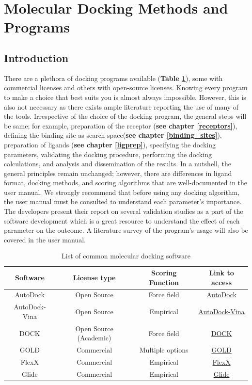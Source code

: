 \chapter*{Molecular Docking Methods and Programs}
\section*{Introduction}
There are a plethora of docking programs available (\textbf{Table \ref{tab:List}}), some with commercial licenses and others with open-source licenses. Knowing every program to make a choice that best suits you is almost always impossible. However, this is also not necessary as there exists ample literature reporting the use of many of the tools. Irrespective of the choice of the docking program, the general steps will be same; for example, preparation of the receptor (\textbf{see chapter \ref{receptors}}), defining the binding site as search space(\textbf{see chapter \ref{binding_sites}}), preparation of ligands (\textbf{see chapter \ref{ligprep}}), specifying the docking parameters, validating the docking procedure, performing the docking calculations, and analysis and dissemination of the results.  In a nutshell, the general principles remain unchanged; however, there are differences in ligand format, docking methods, and scoring algorithms that are well-documented in the user manual. We strongly recommend that before using any docking algorithm, the user manual must be consulted to understand each parameter's importance. The developers present their report on several validation studies as a part of the software development which is a great resource to understand the effect of each parameter on the outcome. A literature survey of the program's usage will also be covered in the user manual. 

\begin{table}[ht]
    \centering
    \caption{List of common molecular docking software}
    \label{tab:List}
    \begin{tabular}{|c|c|c|c|}
    \hline
         \textbf{Software} & \textbf{License type} & \textbf{Scoring Function} & \textbf{Link to access} \\
    \hline
        AutoDock & Open Source & Force field & \href{https://autodock.scripps.edu/download-autodock4/}{AutoDock}  \\
        AutoDock-Vina & Open Source & Empirical & \href{https://github.com/ccsb-scripps/AutoDock-Vina/releases}{AutoDock-Vina}  \\
        DOCK & Open Source (Academic) & Force field  & \href{https://dock.compbio.ucsf.edu}{DOCK}  \\
        GOLD &  Commercial & Multiple options & \href{https://www.ccdc.cam.ac.uk/solutions/software/gold/}{GOLD} \\
        FlexX &  Commercial & Empirical   & \href{https://www.biosolveit.de/products/#FlexX}{FlexX}  \\
        Glide &  Commercial & Empirical  & \href{https://www.schrodinger.com/platform/products/glide/}{Glide} \\
    \hline
    \end{tabular}
\end{table}


